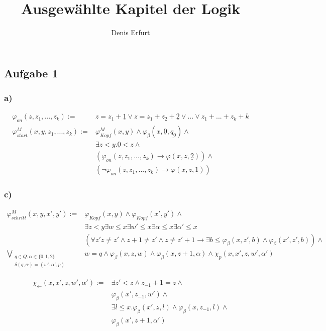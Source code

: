 \documentclass[12pt]{article}
\begin{document}
\title{Ausgewählte Kapitel der Logik}
\author{Denis Erfurt}
\maketitle



\subsection*{Aufgabe 1}
\subsubsection*{a)}
\begin{align*}
  \varphi_{on}(z, z_1,...,z_k):=&z=z_1+\underline{1}\lor z = z_1 + z_2 + \underline{2} \lor ... \lor z_1 + ... +z_k + k \\
  \varphi_{start}^M(x,y,z_1,...,z_k) := &\varphi_{Kopf}^M(x,y) \land
  \varphi_\beta(x,\underline{0},\underline{q_0}) \land \\
  &\exists z < y. \underline{0} < z \land \\
  &(\varphi_{on}(z, z_1, ..., z_k) \rightarrow \varphi(x,z,\underline{2})) \land \\
  &(\neg\varphi_{on}(z, z_1, ..., z_k) \rightarrow \varphi(x,z,\underline{1}))
\end{align*}

\subsubsection*{c)}
\begin{align*}
  \varphi_{schritt}^M(x,y,x',y') :=& \varphi_{Kopf}(x,y) \land \varphi_{Kopf}(x',y') \land \\
  & \exists z < y \exists w \leq x \exists w' \leq x \exists \alpha \leq x \exists \alpha' \leq x\\
  &(\forall z' z\neq z'\land z+1\neq z'\land z\neq z'+1 \rightarrow \exists b\leq \varphi_\beta(x,z',b)\land\varphi_\beta(x',z',b))\land \\
  \bigvee_{\substack{q\in Q,\alpha\in\{\underline{0},\underline{1},\underline{2}\} \\ \delta(q,\alpha)=(w',\alpha',p)}} &
  w=q \land \varphi_\beta(x,z,w) \land \varphi_\beta(x,z+1,\alpha) \land \chi_p(x,x',z,w',\alpha')
\end{align*}

\begin{align*}
  \chi_{\leftarrow}(x,x',z,w',\alpha') := &\exists z'<z \land z_{-1} + 1 = z \land \\
  &\varphi_\beta(x', z_{-1}, w')  \land \\
  &\exists l\leq x.\varphi_\beta(x', z, l)\land \varphi_\beta(x, z_{-1}, l) \land \\
  &\varphi_\beta(x',z+1,\alpha') \\
\end{align*}
\end{document}
